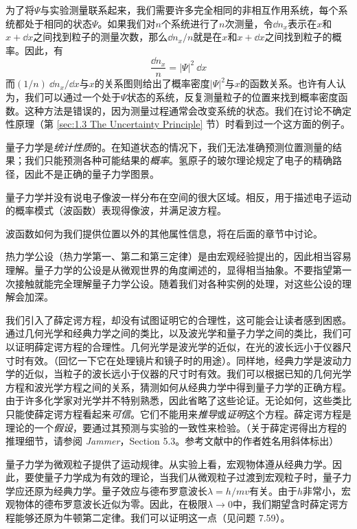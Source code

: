 	为了将$\Psi$与实验测量联系起来，我们需要许多完全相同的非相互作用系统，每个系统都处于相同的状态$\Psi$。如果我们对$n$个系统进行了$n$次测量，令$\dd n_x$表示在$x$和$x+\dd x$之间找到粒子的测量次数，那么$\dd n_x/n$就是在$x$和$x+\dd x$之间找到粒子的概率。因此，有
	\begin{equation*}
		\frac{\dd n_x}{n} = \left|\Psi\right|^2\:\dd x
	\end{equation*}
	而$\left(1/n\right) \:\dd n_x / \dd x$与$x$的关系图则给出了概率密度$\left|\Psi\right|^2$与$x$的函数关系。也许有人认为，我们可以通过一个处于$\Psi$状态的系统，反复测量粒子的位置来找到概率密度函数。这种方法是错误的，因为测量过程通常会改变系统的状态。我们在讨论不确定性原理（第 \ref{sec:1.3 The Uncertainty Principle} 节）时看到过一个这方面的例子。

	量子力学是\textit{统计性质}的。在知道状态的情况下，我们无法准确预测位置测量的结果；我们只能预测各种可能结果的\textit{概率}。氢原子的玻尔理论规定了电子的精确路径，因此不是正确的量子力学图景。

	量子力学并没有说电子像波一样分布在空间的很大区域。相反，用于描述电子运动的概率模式（波函数）表现得像波，并满足波方程。

	波函数如何为我们提供位置以外的其他属性信息，将在后面的章节中讨论。

	热力学公设（热力学第一、第二和第三定律）是由宏观经验提出的，因此相当容易理解。量子力学的公设是从微观世界的角度阐述的，显得相当抽象。不要指望第一次接触就能完全理解量子力学公设。随着我们对各种实例的处理，对这些公设的理解会加深。

	我们引入了薛定谔方程，却没有试图证明它的合理性，这可能会让读者感到困惑。通过几何光学和经典力学之间的类比，以及波光学和量子力学之间的类比，我们可以证明薛定谔方程的合理性。几何光学是波光学的近似，在光的波长远小于仪器尺寸时有效。（回忆一下它在处理镜片和镜子时的用途）。同样地，经典力学是波动力学的近似，当粒子的波长远小于仪器的尺寸时有效。我们可以根据已知的几何光学方程和波光学方程之间的关系，猜测如何从经典力学中得到量子力学的正确方程。由于许多化学家对光学并不特别熟悉，因此省略了这些论证。无论如何，这些类比只能使薛定谔方程看起来\textit{可信}。它们不能用来\textit{推导}或\textit{证明}这个方程。薛定谔方程是理论的一个\textit{假设}，要通过其预测与实验的一致性来检验。（关于薛定谔得出方程的推理细节，请参阅 \textit{Jammer}，Section 5.3。参考文献中的作者姓名用斜体标出）

	量子力学为微观粒子提供了运动规律。从实验上看，宏观物体遵从经典力学。因此，要使量子力学成为有效的理论，当我们从微观粒子过渡到宏观粒子时，量子力学应还原为经典力学。量子效应与德布罗意波长$\lambda=h/mv$有关。由于$h$非常小，宏观物体的德布罗意波长近似为零。因此，在极限$\lambda \to 0$中，我们期望含时薛定谔方程能够还原为牛顿第二定律。我们可以证明这一点（见问题 7.59）。


